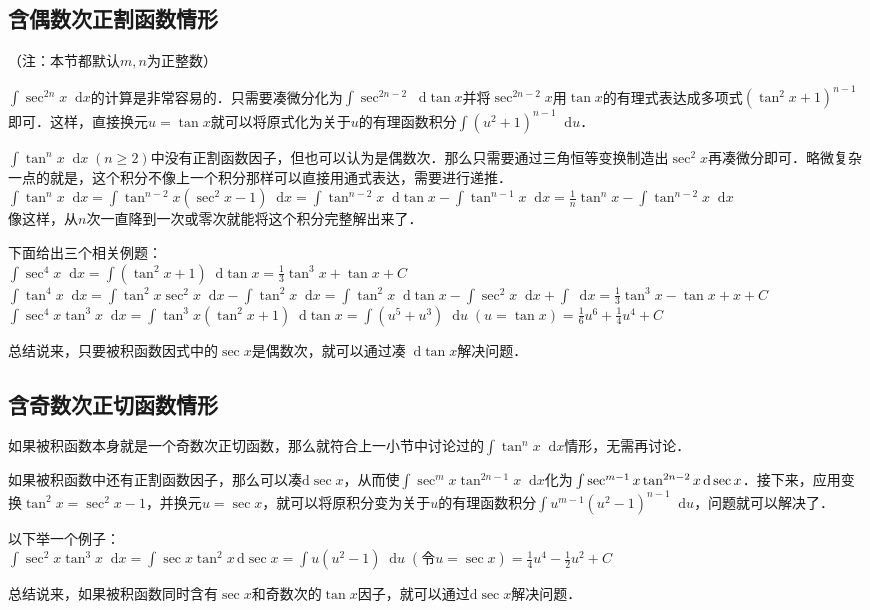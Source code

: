 \documentclass{ctexbook}
\newcommand*{\dif}{\mathop{}\!\mathrm{d}}
\begin{document}
\subsection{含偶数次正割函数情形}
（注：本节都默认$m,n$为正整数）\par
$\int\sec^{2n}{x}\dif{x}$的计算是非常容易的．只需要凑微分化为$\int\sec^{2n-2}\dif{\tan{x}}$并将$\sec^{2n-2}{x}$用$\tan{x}$的有理式表达成多项式$\left(\tan^{2}{x}+1\right)^{n-1}$即可．这样，直接换元$u=\tan{x}$就可以将原式化为关于$u$的有理函数积分$\int\left(u^{2}+1\right)^{n-1}\dif{u}$．\par
$\int\tan^{n}{x}\dif{x}\;\left(n\ge2\right)$中没有正割函数因子，但也可以认为是偶数次．那么只需要通过三角恒等变换制造出$\sec^{2}{x}$再凑微分即可．略微复杂一点的就是，这个积分不像上一个积分那样可以直接用通式表达，需要进行递推．\\
$\int\tan^{n}{x}\dif{x}=\int\tan^{n-2}{x}\left(\sec^{2}x-1\right)\dif{x}=\int\tan^{n-2}{x}\dif{\tan{x}}-\int\tan^{n-1}{x}\dif{x}=\frac{1}{n}\tan^{n}{x}-\int\tan^{n-2}{x}\dif{x}$\\
像这样，从$n$次一直降到一次或零次就能将这个积分完整解出来了．\par
下面给出三个相关例题：\\
$\int\sec^{4}{x}\dif{x}=\int\left(\tan^{2}{x}+1\right)\dif{\tan{x}}=\frac{1}{3}\tan^{3}{x}+\tan{x}+C$\\
$\int\tan^{4}{x}\dif{x}=\int\tan^{2}{x}\sec^{2}{x}\dif{x}-\int\tan^{2}{x}\dif{x}=\int\tan^{2}{x}\dif{\tan{x}}-\int\sec^{2}{x}\dif{x}+\int\dif{x}=\frac{1}{3}\tan^{3}{x}-\tan{x}+x+C$\\
$\int\sec^{4}{x}\tan^{3}{x}\dif{x}=\int\tan^{3}{x}\left(\tan^{2}{x}+1\right)\dif{\tan{x}}=\int\left(u^{5}+u^{3}\right)\dif{u}\;\left(u=\tan{x}\right)=\frac{1}{6}u^{6}+\frac{1}{4}u^{4}+C$\par
总结说来，只要被积函数因式中的$\sec{x}$是偶数次，就可以通过凑$\dif{\tan{x}}$解决问题．\par
\subsection{含奇数次正切函数情形}
如果被积函数本身就是一个奇数次正切函数，那么就符合上一小节中讨论过的$\int\tan^{n}{x}\dif{x}$情形，无需再讨论．\par
如果被积函数中还有正割函数因子，那么可以凑$\mathrm{d}\sec{x}$，从而使$\int\sec^{m}{x}\tan^{2n-1}{x}\dif{x}$化为$\\\int\sec^{m-1}{x}\tan^{2n-2}{x}\,\mathrm{d}\sec{x}$．接下来，应用变换$\tan^{2}{x}=\sec^{2}{x}-1$，并换元$u=\sec{x}$，就可以将原积分变为关于$u$的有理函数积分$\int u^{m-1}\left(u^{2}-1\right)^{n-1}\dif{u}$，问题就可以解决了．\par
以下举一个例子：\\
$\int\sec^{2}{x}\tan^{3}{x}\dif{x}=\int\sec{x}\tan^{2}{x}\,\mathrm{d}\sec{x}=\int u\left(u^{2}-1\right)\dif{u}\;\left(\text{令}u=\sec{x}\right)=\frac{1}{4}u^{4}-\frac{1}{2}u^{2}+C$\par
总结说来，如果被积函数同时含有$\sec{x}$和奇数次的$\tan{x}$因子，就可以通过$\mathrm{d}\sec{x}$解决问题．\par
\end{document}
